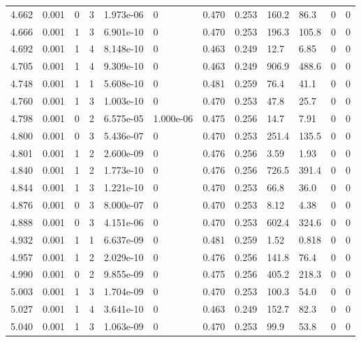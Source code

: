 \documentclass[preview]{standalone}
\begin{document}
{{{{{{\begin{tabular}{L{1.2cm}C{1.2cm} C{0.3cm}C{0.5cm} C{1.4cm}C{1.4cm} C{1.4cm}C{1.4cm} C{1.6cm}C{1.6cm} C{1.6cm}C{1.6cm}}
  4.662  &  0.001  & 0     &  3 &  1.973e-06  & 0  &  0.470&   0.253& 160.2 & 86.3   &  0 & 0  \\ 
  4.666  &  0.001  & 1     &  3 &  6.901e-10  & 0  &  0.470&   0.253& 196.3 & 105.8   &  0 & 0  \\ 
  4.692  &  0.001  & 1     &  4 &  8.148e-10  & 0  &  0.463&   0.249& 12.7 & 6.85   &  0 & 0  \\ 
  4.705  &  0.001  & 1     &  4 &  9.309e-10  & 0  &  0.463&   0.249& 906.9 & 488.6   &  0 & 0  \\ 
  4.748  &  0.001  & 1     &  1 &  5.608e-10  & 0  &  0.481&   0.259& 76.4 & 41.1   &  0 & 0  \\ 
  4.760  &  0.001  & 1     &  3 &  1.003e-10  & 0  &  0.470&   0.253& 47.8 & 25.7   &  0 & 0  \\ 
  4.798  &  0.001  & 0     &  2 &  6.575e-05  & 1.000e-06  &  0.475&   0.256& 14.7 & 7.91   &  0 & 0  \\ 
  4.800  &  0.001  & 0     &  3 &  5.436e-07  & 0  &  0.470&   0.253& 251.4 & 135.5   &  0 & 0  \\ 
  4.801  &  0.001  & 1     &  2 &  2.600e-09  & 0  &  0.476&   0.256& 3.59 & 1.93   &  0 & 0  \\ 
  4.840  &  0.001  & 1     &  2 &  1.773e-10  & 0  &  0.476&   0.256& 726.5 & 391.4   &  0 & 0  \\ 
  4.844  &  0.001  & 1     &  3 &  1.221e-10  & 0  &  0.470&   0.253& 66.8 & 36.0   &  0 & 0  \\ 
  4.876  &  0.001  & 0     &  3 &  8.000e-07  & 0  &  0.470&   0.253& 8.12 & 4.38   &  0 & 0  \\ 
  4.888  &  0.001  & 0     &  3 &  4.151e-06  & 0  &  0.470&   0.253& 602.4 & 324.6   &  0 & 0  \\ 
  4.932  &  0.001  & 1     &  1 &  6.637e-09  & 0  &  0.481&   0.259& 1.52 & 0.818   &  0 & 0  \\ 
  4.957  &  0.001  & 1     &  2 &  2.029e-10  & 0  &  0.476&   0.256& 141.8 & 76.4   &  0 & 0  \\ 
  4.990  &  0.001  & 0     &  2 &  9.855e-09  & 0  &  0.475&   0.256& 405.2 & 218.3   &  0 & 0  \\ 
  5.003  &  0.001  & 1     &  3 &  1.704e-09  & 0  &  0.470&   0.253& 100.3 & 54.0   &  0 & 0  \\ 
  5.027  &  0.001  & 1     &  4 &  3.641e-10  & 0  &  0.463&   0.249& 152.7 & 82.3   &  0 & 0  \\ 
  5.040  &  0.001  & 1     &  3 &  1.063e-09  & 0  &  0.470&   0.253& 99.9 & 53.8   &  0 & 0  \\ 

\end{tabular}}}}}}}
\end{document}
